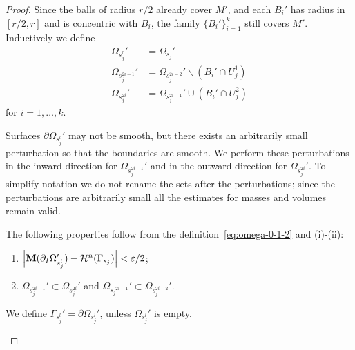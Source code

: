 \begin{lemma}
\begin{proof}
        Since the balls of radius $r/2$ already cover $M'$, and each $B_i'$ has radius in $[r/2,r]$ and is concentric with $B_i$, the family $\{B_i'\}_{i=1}^k$ still covers $M'$. Inductively we define
        \begin{equation}\label{eq:omega-0-1-2}
            \begin{split}
                \Omega_{s_j^0}' &= \Omega_{s_j}'\\
                \Omega_{s_j^{2i - 1}}' &= \Omega_{s_j^{2i - 2}}'\backslash (B_i'\cap U_j^1)\\
                \Omega_{s_j^{2i}}' &= \Omega_{s_j^{2i - 1}}'\cup(B_i'\cap U_j^2)
            \end{split}
        \end{equation}
        for $i = 1, \dots, k$.

        Surfaces $\partial\Omega_{s_j^l}'$ may not be smooth, but there exists an arbitrarily small perturbation so that the boundaries are smooth. We perform these perturbations in the inward direction for $\Omega_{s_j^{2i - 1}}'$ and in the outward direction for $\Omega_{s_j^{2i}}'$. To simplify notation we do not rename the sets after the perturbations; since the perturbations are arbitrarily small all the estimates for masses and volumes remain valid.

        The following properties follow from the definition~\ref{eq:omega-0-1-2} and (i)-(ii):
        \begin{enumerate}
            \item[(a)] $\left| \mathbf{M}(\partial_I\Omega_{s_j^l}') - \mathcal{H}^n(\Gamma_{s_j}) \right| < \varepsilon/2$;
            \item[(b)] $\Omega_{s_j^{2i - 1}}' \subset \Omega_{s_j^{2i}}'$ and $\Omega_{{s_j}^{2i - 1}}' \subset \Omega_{{s_j^{2i - 2}}}'$.
        \end{enumerate}
        We define $\Gamma_{s_j^l}' = \partial\Omega_{s_j^l}'$, unless $\Omega_{s_j^l}'$ is empty.

        \begin{figure}[h]
            \centering
            \begin{tikzpicture}[scale=0.5]


\end{tikzpicture}
\end{figure}
\end{proof}
\end{lemma}
